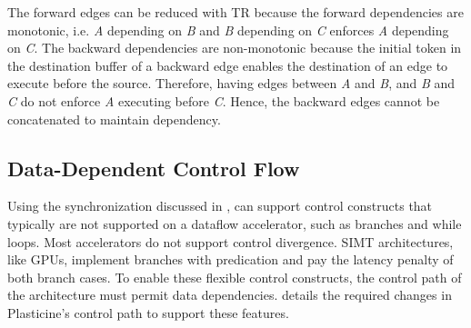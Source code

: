 The forward edges can be reduced with TR because the forward dependencies
are monotonic, i.e. \emph{A} depending on \emph{B} and \emph{B} depending on \emph{C}
enforces \emph{A} depending on \emph{C}. The backward dependencies are non-monotonic because the initial
token in the destination buffer of a backward edge enables the destination of an edge to execute
before the source. 
Therefore, having edges between \emph{A} and \emph{B}, and \emph{B} and \emph{C} do not
enforce \emph{A} executing before \emph{C}. Hence, the backward edges cannot be concatenated to
maintain dependency.



\subsection{Data-Dependent Control Flow} \label{sec:datactrl}
Using the synchronization discussed in , \name can support control constructs that 
typically are not supported on a dataflow accelerator, such as branches and while loops.
Most accelerators do not support control divergence. SIMT architectures, like GPUs,
implement branches with predication and pay the latency penalty of both branch cases.
To enable these flexible control constructs, the control path of the architecture must permit data dependencies.
 details the required changes in Plasticine's control path to support these features.

